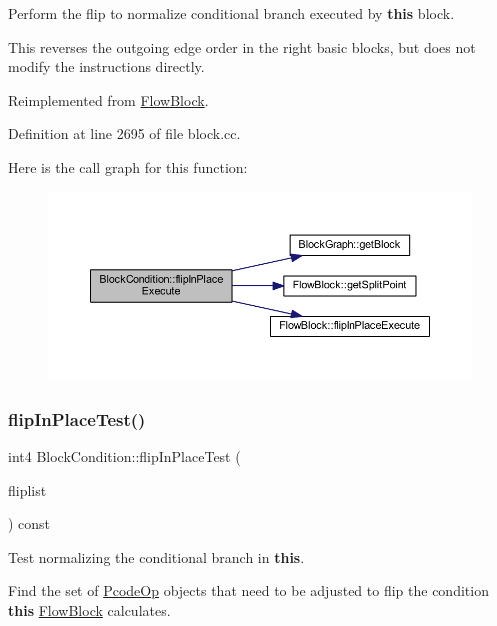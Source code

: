 Perform the flip to normalize conditional branch executed by {\bfseries{this}} block. 

This reverses the outgoing edge order in the right basic blocks, but does not modify the instructions directly. 

Reimplemented from \mbox{\hyperlink{class_flow_block_a263ec50d30f807a8e1286ac37c6728ce}{Flow\+Block}}.



Definition at line 2695 of file block.\+cc.

Here is the call graph for this function\+:
\nopagebreak
\begin{figure}[H]
\begin{center}
\leavevmode
\includegraphics[width=350pt]{class_block_condition_a600c60c9af3b7ad9d7b8f58fa0f7ab5a_cgraph}
\end{center}
\end{figure}
\mbox{\label{class_block_condition_a586d47e72963c4e5f719f3673ef3743c}} 
\subsubsection{\texorpdfstring{flipInPlaceTest()}{flipInPlaceTest()}}
{\footnotesize\ttfamily int4 Block\+Condition\+::flip\+In\+Place\+Test (\begin{DoxyParamCaption}\item[{vector$<$ \mbox{\hyperlink{class_pcode_op}{Pcode\+Op}} $\ast$ $>$ \&}]{fliplist }\end{DoxyParamCaption}) const\hspace{0.3cm}{\ttfamily [virtual]}}



Test normalizing the conditional branch in {\bfseries{this}}. 

Find the set of \mbox{\hyperlink{class_pcode_op}{Pcode\+Op}} objects that need to be adjusted to flip the condition {\bfseries{this}} \mbox{\hyperlink{class_flow_block}{Flow\+Block}} calculates.


